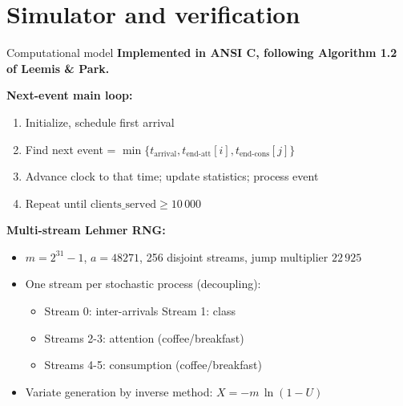 \documentclass[10pt,aspectratio=169]{beamer}
\begin{document}
\section{Simulator and verification}
\begin{frame}{Computational model}
\textbf{Implemented in ANSI C, following Algorithm 1.2 of Leemis \& Park.}

\vspace{0.4cm}
\textbf{Next-event main loop:}
\begin{enumerate}
  \item Initialize, schedule first arrival
  \item Find next event = $\min\{t_{\text{arrival}}, t_{\text{end-att}}[i], t_{\text{end-cons}}[j]\}$
  \item Advance clock to that time; update statistics; process event
  \item Repeat until $\text{clients\_served} \ge 10\,000$
\end{enumerate}

\vspace{0.3cm}
\textbf{Multi-stream Lehmer RNG:}
\begin{itemize}
  \item $m = 2^{31}-1$, $a = 48271$, 256 disjoint streams, jump multiplier $22\,925$
  \item \alert{One stream per stochastic process} (decoupling):
  \begin{itemize}
    \item Stream 0: inter-arrivals \quad
          Stream 1: class
    \item Streams 2-3: attention (coffee/breakfast)
    \item Streams 4-5: consumption (coffee/breakfast)
  \end{itemize}
  \item Variate generation by inverse method: $X = -m\,\ln(1 - U)$
\end{itemize}
\end{frame}
\end{document}
